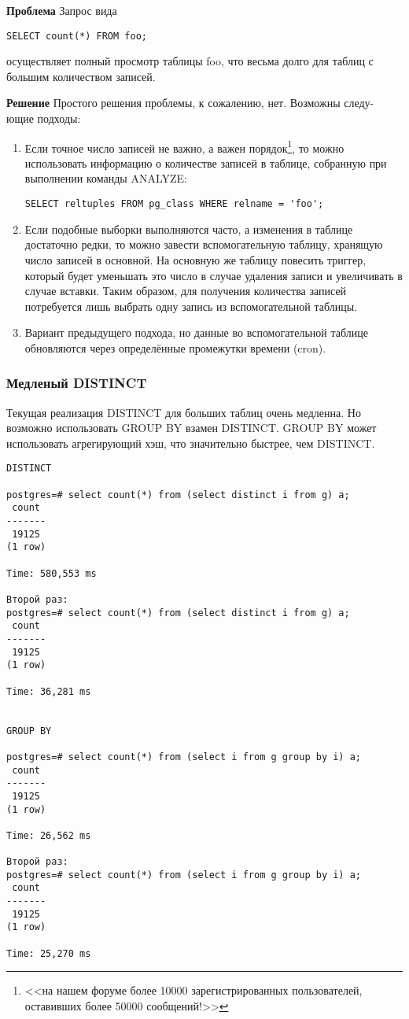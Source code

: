 \textbf{Проблема} Запрос вида
\begin{verbatim}
SELECT count(*) FROM foo;
\end{verbatim}
осуществляет полный просмотр таблицы foo, что весьма долго для таблиц с большим количеством записей.

\textbf{Решение} Простого решения проблемы, к сожалению, нет. Возможны следу-
ющие подходы:
\begin{enumerate}
\item Если точное число записей не важно, а важен порядок\footnote{<<на нашем форуме более 10000 зарегистрированных 
пользователей, оставивших более 50000 сообщений!>>}, то можно использовать информацию о количестве 
записей в таблице, собранную при выполнении команды ANALYZE:
\begin{verbatim}
SELECT reltuples FROM pg_class WHERE relname = 'foo';
\end{verbatim}
\item Если подобные выборки выполняются часто, а изменения в таблице достаточно редки, то можно завести вспомогательную 
таблицу, хранящую число записей в основной. На основную же таблицу повесить триггер, который будет уменьшать это число 
в случае удаления записи и увеличивать в случае вставки. Таким образом, для получения количества записей потребуется лишь 
выбрать одну запись из вспомогательной таблицы.
\item Вариант предыдущего подхода, но данные во вспомогательной таблице обновляются через определённые промежутки времени (cron).
\end{enumerate}

\subsubsection{Медленый DISTINCT}
Текущая реализация DISTINCT для больших таблиц очень медленна. Но возможно использовать GROUP BY взамен DISTINCT. 
GROUP BY может использовать агрегирующий хэш, что значительно быстрее, чем DISTINCT.
\begin{verbatim}
DISTINCT

postgres=# select count(*) from (select distinct i from g) a;
 count 
-------
 19125
(1 row)

Time: 580,553 ms

Второй раз:
postgres=# select count(*) from (select distinct i from g) a;
 count 
-------
 19125
(1 row)

Time: 36,281 ms


GROUP BY

postgres=# select count(*) from (select i from g group by i) a;
 count 
-------
 19125
(1 row)

Time: 26,562 ms

Второй раз:
postgres=# select count(*) from (select i from g group by i) a;
 count 
-------
 19125
(1 row)

Time: 25,270 ms

\end{verbatim}

